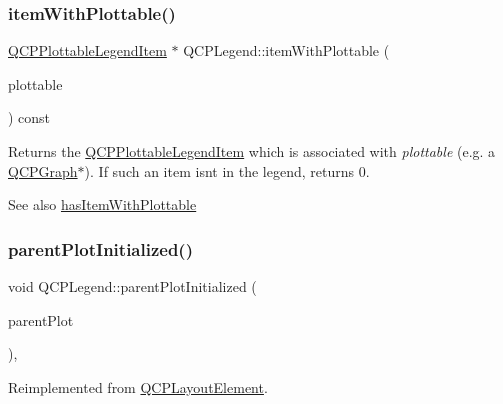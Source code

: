 \subsubsection{\texorpdfstring{itemWithPlottable()}{itemWithPlottable()}}
{\footnotesize\ttfamily \mbox{\hyperlink{class_q_c_p_plottable_legend_item}{Q\+C\+P\+Plottable\+Legend\+Item}} $\ast$ Q\+C\+P\+Legend\+::item\+With\+Plottable (\begin{DoxyParamCaption}\item[{const \mbox{\hyperlink{class_q_c_p_abstract_plottable}{Q\+C\+P\+Abstract\+Plottable}} $\ast$}]{plottable }\end{DoxyParamCaption}) const}

Returns the \mbox{\hyperlink{class_q_c_p_plottable_legend_item}{Q\+C\+P\+Plottable\+Legend\+Item}} which is associated with {\itshape plottable} (e.\+g. a \mbox{\hyperlink{class_q_c_p_graph}{Q\+C\+P\+Graph}}$\ast$). If such an item isn\textquotesingle{}t in the legend, returns 0.

\begin{DoxySeeAlso}{See also}
\mbox{\hyperlink{class_q_c_p_legend_a4b90a442af871582df85c2bc13f91e88}{has\+Item\+With\+Plottable}} 
\end{DoxySeeAlso}
\mbox{\label{class_q_c_p_legend_a2b225cefb5eb267771e2c7c44fd2b408}} 
\subsubsection{\texorpdfstring{parentPlotInitialized()}{parentPlotInitialized()}}
{\footnotesize\ttfamily void Q\+C\+P\+Legend\+::parent\+Plot\+Initialized (\begin{DoxyParamCaption}\item[{\mbox{\hyperlink{class_q_custom_plot}{Q\+Custom\+Plot}} $\ast$}]{parent\+Plot }\end{DoxyParamCaption})\hspace{0.3cm}{\ttfamily [protected]}, {\ttfamily [virtual]}}



Reimplemented from \mbox{\hyperlink{class_q_c_p_layout_element_ab4bb5c5a958451f5f153fdce350f13cf}{Q\+C\+P\+Layout\+Element}}.

\mbox{\label{class_q_c_p_legend_ac91595c3eaa746fe6321d2eb952c63bb}} 
